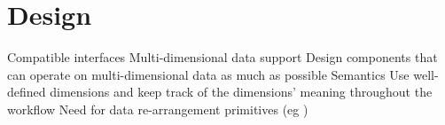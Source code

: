 \section{Design}
\label{s:design}
\begin{outline}
  \1 Compatible interfaces
  \1 Multi-dimensional data support
    \2 Design components that can operate on multi-dimensional data as much as possible
  \1 Semantics
    \2 Use well-defined dimensions and keep track of the dimensions' meaning throughout the workflow
  \1 Need for data re-arrangement primitives (eg \dimreduce)
\end{outline}
